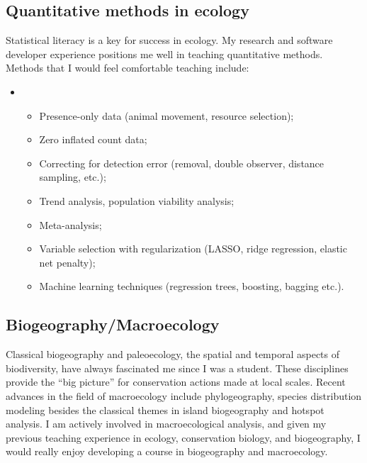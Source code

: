 \subsection{Quantitative methods in ecology}
Statistical literacy is a key for success in ecology. My research and software developer experience positions me well in teaching quantitative methods. Methods that I would feel comfortable teaching include:
\vspace{0.3pc}

\begin{itemize}%
\item[]%
\begin{itemize}%
  \item Presence-only data (animal movement, resource selection);
  \item Zero inflated count data;
  \item Correcting for detection error (removal, double observer, distance sampling, etc.);
  \item Trend analysis, population viability analysis;
  \item Meta-analysis;
  \item Variable selection with regularization (LASSO, ridge regression, elastic net penalty);
  \item Machine learning techniques (regression trees, boosting, bagging etc.).
\end{itemize}%
\end{itemize}%
\vspace{0.5pc}

\subsection{Biogeography/Macroecology}
Classical biogeography and paleoecology, the spatial and temporal aspects of biodiversity, have always fascinated me since I was a student. These disciplines provide the ``big picture'' for conservation actions made at local scales. Recent advances in the field of macroecology include phylogeography, species distribution modeling besides the classical themes in island biogeography and hotspot analysis. I am actively involved in macroecological analysis, and given my previous teaching experience in ecology, conservation biology, and biogeography, I would really enjoy developing a course in biogeography and macroecology.
\vspace{0.5pc}

